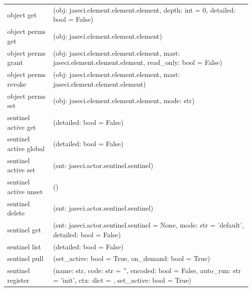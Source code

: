 {\begin{table}[ht]
\begin{tabular}{l p{10cm}}
            object get             & (obj: jaseci.element.element.element, depth: int = 0, detailed: bool = False)                                         \\
            object perms get       & (obj: jaseci.element.element.element)                                                                                 \\
            object perms grant     & (obj: jaseci.element.element.element, mast: jaseci.element.element.element, read\_only: bool = False)                 \\
            object perms revoke    & (obj: jaseci.element.element.element, mast: jaseci.element.element.element)                                           \\
            object perms set       & (obj: jaseci.element.element.element, mode: str)                                                                      \\
            sentinel active get    & (detailed: bool = False)                                                                                              \\
            sentinel active global & (detailed: bool = False)                                                                                              \\
            sentinel active set    & (snt: jaseci.actor.sentinel.sentinel)                                                                                 \\
            sentinel active unset  & ()                                                                                                                    \\
            sentinel delete        & (snt: jaseci.actor.sentinel.sentinel)                                                                                 \\
            sentinel get           & (snt: jaseci.actor.sentinel.sentinel = None, mode: str = 'default', detailed: bool = False)                           \\
            sentinel list          & (detailed: bool = False)                                                                                              \\
            sentinel pull          & (set\_active: bool = True, on\_demand: bool = True)                                                                   \\
            sentinel register      & (name: str, code: str = '', encoded: bool = False, auto\_run: str = 'init', ctx: dict = {}, set\_active: bool = True) \\

\end{tabular}
\end{table}}
